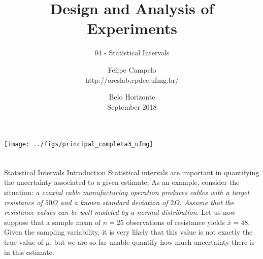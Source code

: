 \documentclass[t]{beamer}
\title[]{Design and Analysis of Experiments}
\subtitle[]{04 - Statistical Intervals}
\author[]{Felipe Campelo\\{\footnotesize http://orcslab.cpdee.ufmg.br/}}
\institute{Graduate Program in Electrical Engineering}
\date{\scriptsize Belo Horizonte\\September 2018}
\begin{document}
\begin{frame}
\begin{flushright}
\texttt{[image: ../figs/principal\_completa3\_ufmg]}
\end{flushright}
  \titlepage
\end{frame}


  \begin{frame}[b]
		\frametitle{}
\begin{columns}[T]
\end{columns}
\vhalf
{}
\end{frame}


\begin{ftst}
{Statistical Intervals}
{Introduction}
Statistical intervals are important in quantifying the uncertainty associated to a given estimate;
\vone
As an example, consider the situation: \textit{a coaxial cable manufacturing operation produces cables with a target resistance of $50\Omega$ and a known standard deviation of $2\Omega$. Assume that the resistance values can be well modeled by a normal distribution}.
\vone
Let us now suppose that a sample mean of $n=25$ observations of resistance  yields $\bar{x} = 48$. Given the sampling variability, it is very likely that this value is not exactly the true value of $\mu$, but we are so far unable quantify how much uncertainty there is in this estimate.
\end{ftst}
\end{document}

